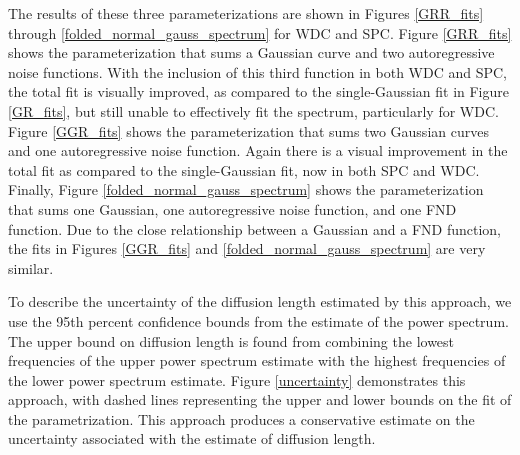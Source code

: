\documentclass[draft, jgrga]{AGUTeX}
\begin{document}
\begin{article}
The results of these three parameterizations are shown in Figures \ref{GRR_fits} through \ref{folded_normal_gauss_spectrum} for WDC and SPC. Figure \ref{GRR_fits} shows the parameterization that sums a Gaussian curve and two autoregressive noise functions. With the inclusion of this third function in both WDC and SPC, the total fit is visually improved, as compared to the single-Gaussian fit in Figure \ref{GR_fits}, but still unable to effectively fit the spectrum, particularly for WDC. Figure \ref{GGR_fits} shows the parameterization that sums two Gaussian curves and one autoregressive noise function. Again there is a visual improvement in the total fit as compared to the single-Gaussian fit, now in both SPC and WDC. Finally, Figure \ref{folded_normal_gauss_spectrum} shows the parameterization that sums one Gaussian, one autoregressive noise function, and one FND function. Due to the close relationship between a Gaussian and a FND function, the fits in Figures \ref{GGR_fits} and \ref{folded_normal_gauss_spectrum} are very similar.

To describe the uncertainty of the diffusion length estimated by this approach, we use the 95th percent confidence bounds from the estimate of the power spectrum. The upper bound on diffusion length is found from combining the lowest frequencies of the upper power spectrum estimate with the highest frequencies of the lower power spectrum estimate. Figure \ref{uncertainty} demonstrates this approach, with dashed lines representing the upper and lower bounds on the fit of the parametrization. This approach produces a conservative estimate on the uncertainty associated with the estimate of diffusion length.



\end{article}
\end{document}
